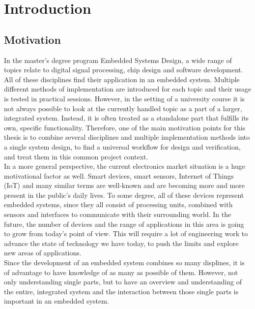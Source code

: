 \chapter{Introduction}
\label{cha:Introduction}

\section{Motivation}

In the master's degree program Embedded Systems Design, a wide range of topics relate to digital signal processing, chip design and software development.
All of these disciplines find their application in an embedded system.
Multiple different methods of implementation are introduced for each topic and their usage is tested in practical sessions.
However, in the setting of a university course it is not always possible to look at the currently handled topic as a part of a larger, integrated system.
Instead, it is often treated as a standalone part that fulfills its own, specific functionality.
Therefore, one of the main motivation points for this thesis is to combine several disciplines and multiple implementation methods into a single system design, to find a universal workflow for design and verification, and treat them in this common project context.\\

In a more general perspective, the current electronics market situation is a huge motivational factor as well.
Smart devices, smart sensors, Internet of Things (IoT) and many similar terms are well-known and are becoming more and more present in the public's daily lives.
To some degree, all of these devices represent embedded systems, since they all consist of processing units, combined with sensors and interfaces to communicate with their surrounding world.
In the future, the number of devices and the range of applications in this area is going to grow from today's point of view.
This will require a lot of engineering work to advance the state of technology we have today, to push the limits and explore new areas of applications.\\

Since the development of an embedded system combines so many displines, it is of advantage to have knowledge of as many as possible of them.
However, not only understanding single parts, but to have an overview and understanding of the entire, integrated system and the interaction between those single parts is important in an embedded system.\\

